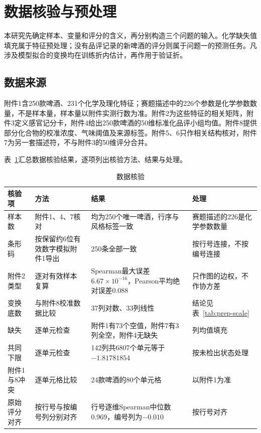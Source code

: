 \section{数据核验与预处理}\label{sec:preprocess}

本研究先确定样本、变量和评分的含义，再分别构造三个问题的输入。化学缺失值填充属于特征预处理；没有品评记录的新啤酒的评分则属于问题一的预测任务。凡涉及模型拟合的变换均在训练折内估计，再作用于验证折。

\subsection{数据来源}

附件1含250款啤酒、231个化学及理化特征；赛题描述中的226个参数是化学参数数量，不是样本量，样本量以附件实测行数为准。附件2为这些特征的相关矩阵，附件3定义感官记分卡，附件4给出250款啤酒的50维标准化品评小组均值。附件8提供部分化合物的校准浓度、气味阈值及来源标签。附件5、6只作相关结构核对，附件7为另一套描述符，不与附件3的50维评分合并。

表~\ref{tab:prep-audit}汇总数据核验结果，逐项列出核验方法、结果与处理。
\begin{table}[htbp]\centering\small
\caption{数据核验}\label{tab:prep-audit}
\begin{tabular}{>{\raggedright\arraybackslash}p{2.6cm}>{\raggedright\arraybackslash}p{4.0cm}>{\raggedright\arraybackslash}p{4.2cm}>{\raggedright\arraybackslash}p{2.6cm}}
\toprule
核验项 & 方法 & 结果 & 处理 \\
\midrule
样本数 & 附件1、4、7核对 & 均为250个唯一啤酒，行序与风格标签一致 & 赛题描述的226是化学参数数量 \\
条形码 & 按保留约6位有效数字模拟附件1导出 & 250条全部一致 & 按行号连接，不按编号连接 \\
附件2类型 & 逐对有效样本复算 & Spearman最大误差$6.67\times10^{-16}$，Pearson平均绝对误差0.088 & 只作图的边权，不作协方差 \\
变换底数 & 与附件8校准数据比较 & 37列对数、33列线性 & 结论见表~\ref{tab:prep-scale} \\
缺失 & 逐单元检查 & 附件1有73个空值，附件7有3列全空，附件4无缺失 & 列均值填充 \\
共同下限 & 逐单元检查 & 142列共6807个单元等于$-1.81781854$ & 按未检出状态处理 \\
附件1与8冲突 & 逐单元格比较 & 24款啤酒的80个单元格 & 以附件1为准 \\
原始评分对齐 & 按行号与按编号列分别对齐 & 行号逐维Spearman中位数0.969，编号列为$-0.010$ & 按行号对齐 \\
\bottomrule
\end{tabular}
\end{table}

